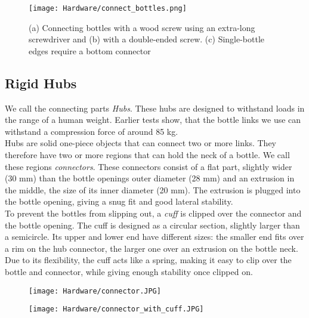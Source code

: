 \begin{figure}[h!]
    \texttt{[image: Hardware/connect\_bottles.png]}
    \centering
    \caption{(a) Connecting bottles with a wood screw using an extra-long screwdriver and (b) with a double-ended screw. (c) Single-bottle edges require a bottom connector}
    \label{fig:connect_bottles}
\end{figure}

\subsection{Rigid Hubs}
We call the connecting parts \textit{Hubs}. These hubs are designed to withstand loads in the range of a human weight. Earlier tests show, that the bottle links we use can withstand a compression force of around 85 kg.\\
Hubs are solid one-piece objects that can connect two or more links. They therefore have two or more regions that can hold the neck of a bottle. We call these regions \textit{connectors}. These connectors consist of a flat part, slightly wider (30 mm) than the bottle openings outer diameter (28 mm) and an extrusion in the middle, the size of its inner diameter (20 mm). The extrusion is plugged into the bottle opening, giving a snug fit and good lateral stability.\\
To prevent the bottles from slipping out, a \textit{cuff} is clipped over the connector and the bottle opening. The cuff is designed as a circular section, slightly larger than a semicircle. Its upper and lower end have different sizes: the smaller end fits over a rim on the hub connector, the larger one over an extrusion on the bottle neck. Due to its flexibility, the cuff acts like a spring, making it easy to clip over the bottle and connector, while giving enough stability once clipped on.

\begin{figure}
  \centering
  \begin{minipage}{.5\textwidth}
    \centering
    \texttt{[image: Hardware/connector.JPG]}
    \label{fig:connector}
  \end{minipage}%
  \begin{minipage}{.5\textwidth}
    \centering
    \texttt{[image: Hardware/connector\_with\_cuff.JPG]}
    \label{fig:connector_with_cuff}
  \end{minipage}
\end{figure}

